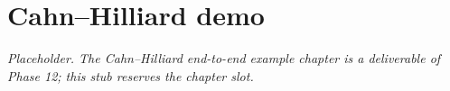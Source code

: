 \chapter{Cahn--Hilliard demo}
\label{chap:cahn-hilliard}

\textit{Placeholder. The Cahn--Hilliard end-to-end example chapter is a
deliverable of Phase 12; this stub reserves the chapter slot.}
